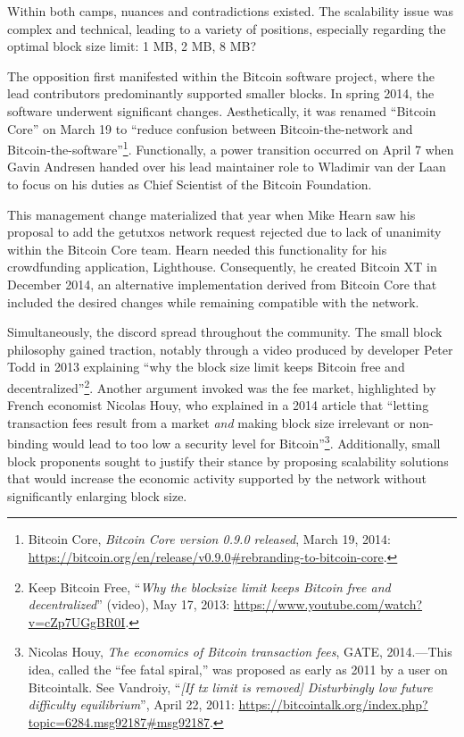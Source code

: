 \documentclass[
  a5paper,
  smalldemyvopaper,10pt,twoside,onecolumn,openright,extrafontsizes,hidelinks]{memoir}
\begin{document}
Within both camps, nuances and contradictions existed. The scalability
issue was complex and technical, leading to a variety of positions,
especially regarding the optimal block size limit: 1 MB, 2 MB, 8 MB?

The opposition first manifested within the Bitcoin software project,
where the lead contributors predominantly supported smaller blocks. In
spring 2014, the software underwent significant changes. Aesthetically,
it was renamed ``Bitcoin Core'' on March 19 to ``reduce confusion
between Bitcoin-the-network and Bitcoin-the-software''\footnote{Bitcoin
  Core, \emph{Bitcoin Core version 0.9.0 released}, March 19, 2014:
  \url{https://bitcoin.org/en/release/v0.9.0\#rebranding-to-bitcoin-core}.}.
Functionally, a power transition occurred on April 7 when Gavin Andresen
handed over his lead maintainer role to Wladimir van der Laan to focus
on his duties as Chief Scientist of the Bitcoin Foundation.

This management change materialized that year when Mike Hearn saw his
proposal to add the getutxos network request rejected due to lack of
unanimity within the Bitcoin Core team. Hearn needed this functionality
for his crowdfunding application, Lighthouse. Consequently, he created
Bitcoin XT in December 2014, an alternative implementation derived from
Bitcoin Core that included the desired changes while remaining
compatible with the network.

Simultaneously, the discord spread throughout the community. The small
block philosophy gained traction, notably through a video produced by
developer Peter Todd in 2013 explaining ``why the block size limit keeps
Bitcoin free and decentralized''\footnote{Keep Bitcoin Free, ``\emph{Why
  the blocksize limit keeps Bitcoin free and decentralized}'' (video),
  May 17, 2013: \url{https://www.youtube.com/watch?v=cZp7UGgBR0I}.}.
Another argument invoked was the fee market, highlighted by French
economist Nicolas Houy, who explained in a 2014 article that ``letting
transaction fees result from a market \emph{and} making block size
irrelevant or non-binding would lead to too low a security level for
Bitcoin''\footnote{Nicolas Houy, \emph{The economics of Bitcoin
  transaction fees}, GATE, 2014.---This idea, called the ``fee fatal
  spiral,'' was proposed as early as 2011 by a user on Bitcointalk. See
  Vandroiy, ``\emph{{[}If tx limit is removed{]} Disturbingly low future
  difficulty equilibrium}'', April 22, 2011:
  \url{https://bitcointalk.org/index.php?topic=6284.msg92187\#msg92187}.}.
Additionally, small block proponents sought to justify their stance by
proposing scalability solutions that would increase the economic
activity supported by the network without significantly enlarging block
size.
\end{document}

